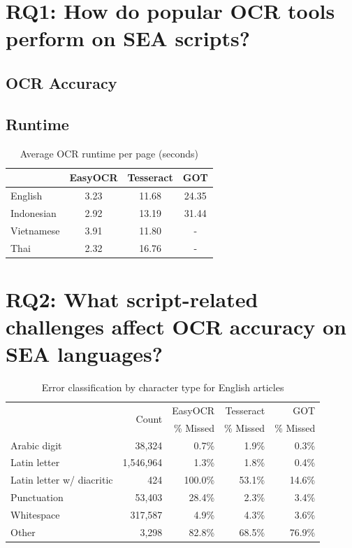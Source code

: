 \documentclass[12pt,oneside]{memoir}
\begin{document}
\section{RQ1: How do popular OCR tools perform on SEA scripts?}

\subsection{OCR Accuracy}

\subsection{Runtime}

\begin{table}[ht]
    \caption{Average OCR runtime per page (seconds)}
    \label{table:runtime}
    \centering
    \begin{tabular}{lccc}
        \toprule
        & EasyOCR & Tesseract & GOT\\ 
        \midrule
        English & 3.23 & 11.68 & 24.35\\
        Indonesian & 2.92 & 13.19 & 31.44\\
        Vietnamese & 3.91 & 11.80 & -\\
        Thai & 2.32 & 16.76 & -\\
        \bottomrule
    \end{tabular}
\end{table}

\section{RQ2: What script-related challenges affect OCR accuracy on SEA languages?}

\begin{table}[ht]
    \caption{Error classification by character type for English articles}
    \label{table:english-error-classification}
    \centering
    \begin{tabular}{lrrrr}
        \toprule
        & \multirow{2}{*}{Count} & EasyOCR & Tesseract & GOT\\
        & & \% Missed & \% Missed & \% Missed\\
        \midrule
        Arabic digit & 38,324 & 0.7\% & 1.9\% & 0.3\%\\
        Latin letter & 1,546,964 & 1.3\% & 1.8\% & 0.4\%\\
        Latin letter w/ diacritic & 424 & 100.0\% & 53.1\% & 14.6\%\\
        Punctuation & 53,403 & 28.4\% & 2.3\% & 3.4\%\\
        Whitespace & 317,587 & 4.9\% & 4.3\% & 3.6\%\\
        Other & 3,298 & 82.8\% & 68.5\% & 76.9\%\\
        \bottomrule
    \end{tabular}
\end{table}
\end{document}
